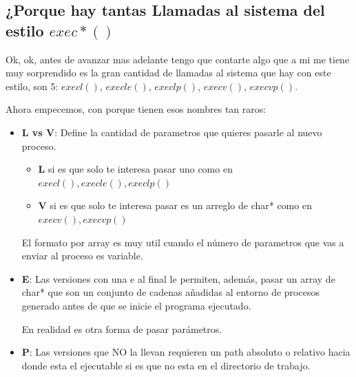 \documentclass[12pt, fleqn]{report}                             %
\begin{document}
                \subsection{¿Porque hay tantas Llamadas al sistema del estilo $exec*()$}

                    Ok, ok, antes de avanzar mas adelante tengo que contarte algo que
                    a mi me tiene muy sorprendido es la gran cantidad de llamadas
                    al sistema que hay con este estilo, son 5:
                    $execl()$, $execle()$, $execlp()$, $execv()$, $execvp()$.

                    Ahora empecemos, con porque tienen esos nombres tan raros:

                    \begin{itemize}
                        \item \textbf{L vs V}:
                            Define la cantidad de parametros que quieres pasarle al
                            nuevo proceso.

                            \begin{itemize}
                                \item \textbf{L} si es que solo te interesa pasar uno
                                como en $execl(), execle(), execlp()$

                                \item \textbf{V} si es que solo te interesa pasar es
                                un arreglo de char* como en $execv(), execvp()$
                            \end{itemize}

                            El formato por array es muy util cuando el número
                            de parametros que vas a enviar al proceso es variable.


                        \item \textbf{E}:
                            Las versiones con una e al final le permiten, además,
                            pasar un array de char* que son un conjunto de cadenas añadidas al entorno de procesos generado antes de que se inicie el programa ejecutado.

                            En realidad es otra forma de pasar parámetros.

                        \item \textbf{P}:
                            Las versiones que NO la llevan requieren un path absoluto
                            o relativo hacia donde esta el ejecutable si es que no
                            esta en el directorio de trabajo.

                    \end{itemize}
\end{document}
